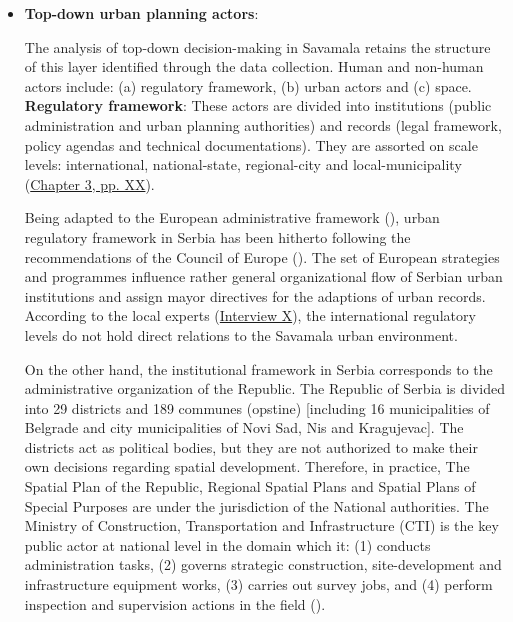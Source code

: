 \documentclass[11pt]{report}
\begin{document}
\begin{itemize}
\item \textbf{Top-down urban planning actors}:

The analysis of top-down decision-making in Savamala retains the structure of this layer identified through the data collection.
Human and non-human actors include:
(a) regulatory framework,
(b) urban actors
and
(c) space.
\\

\textbf{Regulatory framework}: 
These actors are divided into institutions (public administration and urban planning authorities) and records (legal framework, policy agendas and technical documentations).
They are assorted on scale levels: international, national-state, regional-city and local-municipality (\href{ref}{Chapter 3, pp. XX}). 

Being adapted to the European administrative framework (\cite{Official gazette RS 09/2014}), urban regulatory framework in Serbia has been hitherto following the recommendations of the Council of Europe
(\href{ref}{\citealt{ministarstvo_prostora_urbani_2014}}). The set of European strategies and programmes influence rather general organizational flow of Serbian urban institutions and assign mayor directives for the adaptions of urban records.
According to the local experts
(\href{InterviewX}{Interview X}),
the international regulatory levels do not hold direct relations to the Savamala urban environment.

On the other hand, the institutional framework in Serbia corresponds to the administrative organization of the Republic.
The Republic of Serbia is divided into 29 districts and 189 communes (opstine) [including 16 municipalities of Belgrade and city municipalities of Novi Sad, Nis and Kragujevac].
The districts act as political bodies, but they are not authorized to make their own decisions regarding spatial development.
Therefore, in practice, The Spatial Plan of the Republic, Regional Spatial Plans and Spatial Plans of Special Purposes are under the jurisdiction of the National authorities. 
The Ministry of Construction, Transportation and Infrastructure (CTI) is the key public actor at national level in the domain which it:
(1) conducts administration tasks,
(2) governs strategic construction, site-development and infrastructure equipment works,
(3) carries out survey jobs,
and
(4) perform inspection and supervision actions in the field (\href{ref}{\citealt{maksic_european_2012}}).


\end{itemize}
\end{document}
